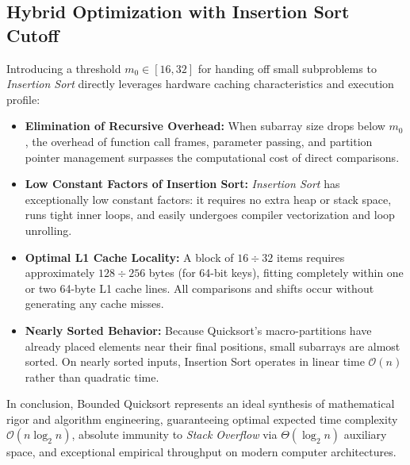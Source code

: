 \subsection{Hybrid Optimization with Insertion Sort Cutoff}
\label{subsec:bqs-cutoff-insertion-sort}

Introducing a threshold $m_0 \in [16, 32]$ for handing off small subproblems to \textit{Insertion Sort} directly leverages hardware caching characteristics and execution profile:

\begin{itemize}
  \item \textbf{Elimination of Recursive Overhead:} When subarray size drops below $m_0$, the overhead of function call frames, parameter passing, and partition pointer management surpasses the computational cost of direct comparisons.
  \item \textbf{Low Constant Factors of Insertion Sort:} \textit{Insertion Sort} has exceptionally low constant factors: it requires no extra heap or stack space, runs tight inner loops, and easily undergoes compiler vectorization and loop unrolling.
  \item \textbf{Optimal L1 Cache Locality:} A block of $16 \div 32$ items requires approximately $128 \div 256$ bytes (for 64-bit keys), fitting completely within one or two 64-byte L1 cache lines. All comparisons and shifts occur without generating any cache misses.
  \item \textbf{Nearly Sorted Behavior:} Because Quicksort's macro-partitions have already placed elements near their final positions, small subarrays are almost sorted. On nearly sorted inputs, Insertion Sort operates in linear time $\mathcal{O}(n)$ rather than quadratic time.
\end{itemize}

In conclusion, Bounded Quicksort represents an ideal synthesis of mathematical rigor and algorithm engineering, guaranteeing optimal expected time complexity $\mathcal{O}(n \log_2 n)$, absolute immunity to \textit{Stack Overflow} via $\Theta(\log_2 n)$ auxiliary space, and exceptional empirical throughput on modern computer architectures.
